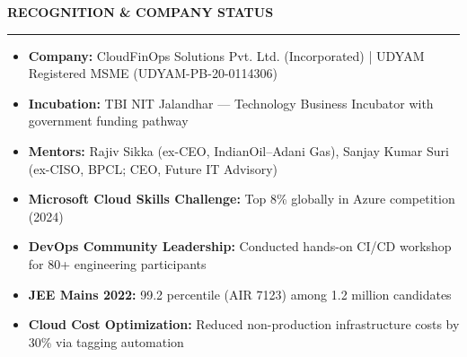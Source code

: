 \documentclass[a4paper,10pt]{article}
\newcommand{\cvsection}[1]{%
  \vspace{2mm}
  \noindent\textbf{\large\MakeUppercase{#1}}
  \vspace{1mm}
  \hrule
  \vspace{1.5mm}
}
\begin{document}
\cvsection{Recognition \& Company Status}
\begin{itemize}[itemsep=0.5mm]
    \item \textbf{Company:} CloudFinOps Solutions Pvt. Ltd. (Incorporated) | UDYAM Registered MSME (UDYAM-PB-20-0114306)
    \item \textbf{Incubation:} TBI NIT Jalandhar --- Technology Business Incubator with government funding pathway
    \item \textbf{Mentors:} Rajiv Sikka (ex-CEO, IndianOil--Adani Gas), Sanjay Kumar Suri (ex-CISO, BPCL; CEO, Future IT Advisory)
    \item \textbf{Microsoft Cloud Skills Challenge:} Top 8\% globally in Azure competition (2024)
    \item \textbf{DevOps Community Leadership:} Conducted hands-on CI/CD workshop for 80+ engineering participants
    \item \textbf{JEE Mains 2022:} 99.2 percentile (AIR 7123) among 1.2 million candidates
    \item \textbf{Cloud Cost Optimization:} Reduced non-production infrastructure costs by 30\% via tagging automation
\end{itemize}
\end{document}
